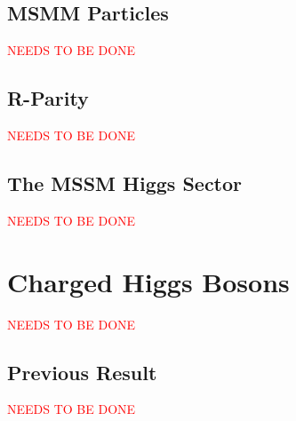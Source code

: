 	\subsection{MSMM Particles}
		\textcolor{red}{NEEDS TO BE DONE}

	\subsection{R-Parity}
		\textcolor{red}{NEEDS TO BE DONE}

	\subsection{The MSSM Higgs Sector}
		\textcolor{red}{NEEDS TO BE DONE}

\section{Charged Higgs Bosons}
	\textcolor{red}{NEEDS TO BE DONE}

	\subsection{Previous Result}
		\textcolor{red}{NEEDS TO BE DONE}